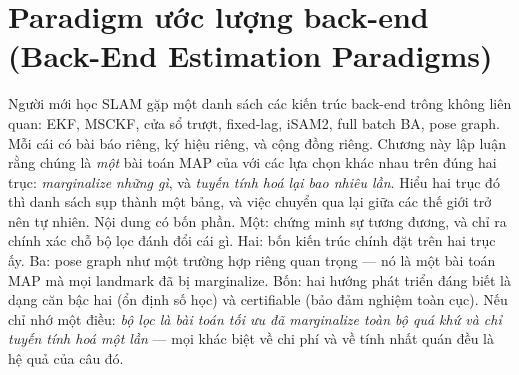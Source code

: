 \documentclass[../../vslam.tex]{subfiles}
\begin{document}
\chapter{Paradigm ước lượng back-end (Back-End Estimation Paradigms)}

\begin{tomtat}
Người mới học SLAM gặp một danh sách các kiến trúc back-end trông không liên quan: EKF, MSCKF, cửa sổ trượt, fixed-lag, iSAM2, full batch BA, pose graph. Mỗi cái có bài báo riêng, ký hiệu riêng, và cộng đồng riêng. Chương này lập luận rằng chúng là \emph{một} bài toán MAP của  với các lựa chọn khác nhau trên đúng hai trục: \emph{marginalize những gì}, và \emph{tuyến tính hoá lại bao nhiêu lần}. Hiểu hai trục đó thì danh sách sụp thành một bảng, và việc chuyển qua lại giữa các thế giới trở nên tự nhiên. Nội dung có bốn phần. Một: chứng minh sự tương đương, và chỉ ra chính xác chỗ bộ lọc đánh đổi cái gì. Hai: bốn kiến trúc chính đặt trên hai trục ấy. Ba: pose graph như một trường hợp riêng quan trọng --- nó là một bài toán MAP mà mọi landmark đã bị marginalize. Bốn: hai hướng phát triển đáng biết là dạng căn bậc hai (ổn định số học) và certifiable (bảo đảm nghiệm toàn cục). Nếu chỉ nhớ một điều: \emph{bộ lọc là bài toán tối ưu đã marginalize toàn bộ quá khứ và chỉ tuyến tính hoá một lần} --- mọi khác biệt về chi phí và về tính nhất quán đều là hệ quả của câu đó.
\end{tomtat}
\end{document}
